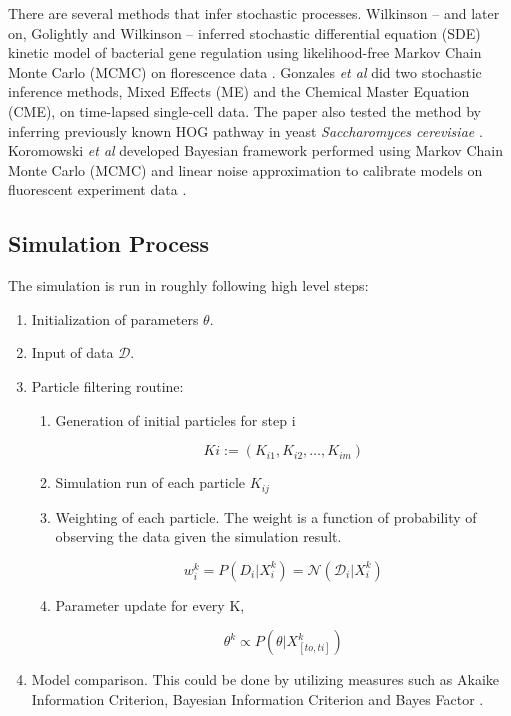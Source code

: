 \documentclass{bioinfo}
\begin{document}
There are several methods that infer stochastic processes. Wilkinson -- and later on, Golightly and Wilkinson --  inferred stochastic differential equation (SDE) kinetic model of bacterial gene regulation using likelihood-free Markov Chain Monte Carlo (MCMC) on florescence data \citep{Wilkinson10, GolightlyWilkinson10}. Gonzales \textit{et al} did two stochastic inference methods, Mixed Effects (ME) and the Chemical Master Equation (CME), on time-lapsed single-cell data. The paper also tested the method by inferring previously known HOG pathway in yeast \textit{Saccharomyces cerevisiae} \citep{Gonzales13}. Koromowski \textit{et al} developed Bayesian framework performed using Markov Chain Monte Carlo (MCMC) and linear noise approximation to calibrate models on fluorescent experiment data \citep{Komorowski09}.


\subsection{Simulation Process}

The simulation is run in roughly following high level steps:

\begin{enumerate}
\item Initialization of parameters $\theta$.
\item Input of data $\mathcal{D}$.
\item Particle filtering routine:

\begin{enumerate}
\item Generation of initial particles for step i

\begin{equation}
Ki := (K_{i1}, K_{i2}, \dots, K_{im})\label{eq:11}
\end{equation}

\item Simulation run of each particle $K_{ij}$
\item Weighting of each particle. The weight is a function of probability of observing the data given the simulation result.

\begin{equation}
w_i^k = P(D_i | X_i^k) = \mathcal{N}(\mathcal{D}_i | X_i^k)\label{eq:12}
\end{equation}

\item Parameter update for every K,

\begin{equation}
\theta^k \propto P(\theta | X^k_{[to, ti]})\label{eq:13}
\end{equation}

\end{enumerate}

\item Model comparison. This could be done by utilizing measures such as Akaike Information Criterion, Bayesian Information Criterion and Bayes Factor \citep{PosadaBuckley14, Bozdogan87}.

\end{enumerate}
\end{document}
